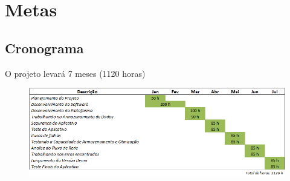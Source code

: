 \chapter[Metas]{Metas}







\section[Cronograma]{Cronograma}




O projeto levará 7 meses (1120 horas)




\begin{figure}[htb]
	\begin{center}
	    \includegraphics[scale=0.8]{figuras/diagramaGanttCrono}
	\end{center}
\end{figure}

